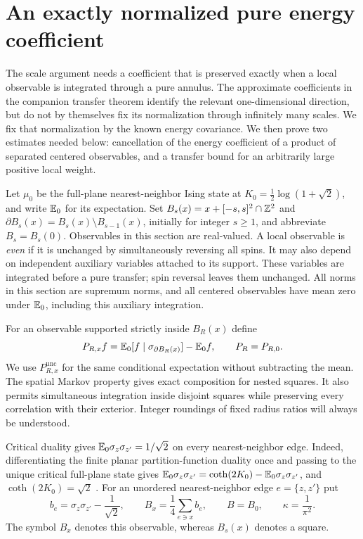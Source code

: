 \section{An exactly normalized pure energy coefficient}
\label{sec:pure}

The scale argument needs a coefficient that is preserved exactly when a
local observable is integrated through a pure annulus.  The approximate
coefficients in the companion transfer theorem identify the relevant
one-dimensional direction, but do not by themselves fix its normalization
through infinitely many scales.  We fix that normalization by the known
energy covariance.  We then prove two estimates needed below: cancellation
of the energy coefficient of a product of separated centered observables,
and a transfer bound for an arbitrarily large positive local weight.

Let $\mu_0$ be the full-plane nearest-neighbor Ising state at
$K_0=\frac12\log(1+\sqrt2)$, and write $\mathbb E_0$ for its expectation.
Set $B_s(x)=x+[-s,s]^2\cap\mathbb Z^2$ and
$\partial B_s(x)=B_s(x)\setminus B_{s-1}(x)$, initially for integer
$s\geq1$, and abbreviate $B_s=B_s(0)$.  Observables in this section are
real-valued.  A local observable is \emph{even} if it is unchanged by
simultaneously reversing all spins.  It may also depend on independent
auxiliary variables attached to its support.  These variables are integrated
before a pure transfer; spin reversal leaves them unchanged.  All norms in
this section are supremum norms, and all centered observables have mean zero
under $\mathbb E_0$, including this auxiliary integration.

For an observable supported strictly inside $B_R(x)$ define
\[
 P_{R,x}f=\mathbb E_0[f\mid\sigma_{\partial B_R(x)}]-\mathbb E_0f,
 \qquad P_R=P_{R,0}.
\]
We use $P_{R,x}^{\mathrm{unc}}$ for the same conditional expectation without
subtracting the mean.  The spatial Markov property gives exact composition
for nested squares.  It also permits simultaneous integration inside
disjoint squares while preserving every correlation with their exterior.
Integer roundings of fixed radius ratios will always be understood.

Critical duality gives $\mathbb E_0\sigma_z\sigma_{z'}=1/\sqrt2$ on every
nearest-neighbor edge.  Indeed, differentiating the finite planar
partition-function duality once and passing to the unique critical
full-plane state gives
$\mathbb E_0\sigma_z\sigma_{z'}=\coth(2K_0)-\mathbb E_0\sigma_z\sigma_{z'}$,
and $\coth(2K_0)=\sqrt2$ \cite{KW}.
For an unordered nearest-neighbor edge $e=\{z,z'\}$ put
\[
 b_e=\sigma_z\sigma_{z'}-\frac1{\sqrt2},\qquad
 B_x=\frac14\sum_{e\ni x}b_e,\qquad B=B_0,
 \qquad \kappa=\frac1{\pi^2}.
\]
The symbol $B_x$ denotes this observable, whereas $B_s(x)$ denotes a square.

